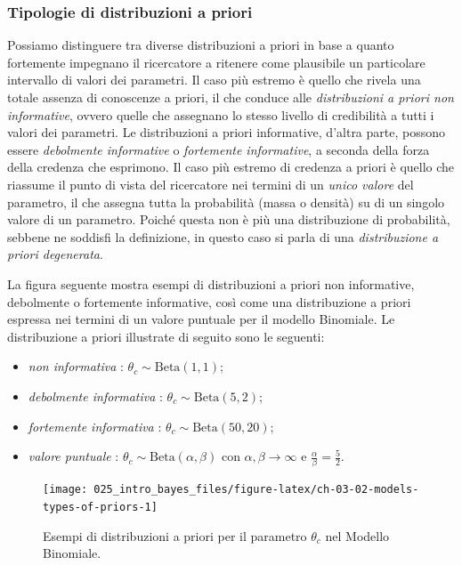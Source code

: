 \documentclass[
  10pt,
  italian,
  a4paper,
  extrafontsizes,onecolumn,openright
  ]{memoir}
\providecommand{\tightlist}{%
  \setlength{\itemsep}{0pt}\setlength{\parskip}{0pt}}
\begin{document}
\hypertarget{tipologie-di-distribuzioni-a-priori}{%
\subsubsection{Tipologie di distribuzioni a priori}\label{tipologie-di-distribuzioni-a-priori}}

Possiamo distinguere tra diverse distribuzioni a priori in base a quanto fortemente impegnano il ricercatore a ritenere come plausibile un particolare intervallo di valori dei parametri. Il caso più estremo è quello che rivela una totale assenza di conoscenze a priori, il che conduce alle \emph{distribuzioni a priori non informative}, ovvero quelle che assegnano lo stesso livello di credibilità a tutti i valori dei parametri. Le distribuzioni a priori informative, d'altra parte, possono essere \emph{debolmente informative} o \emph{fortemente informative}, a seconda della forza della credenza che esprimono. Il caso più estremo di credenza a priori è quello che riassume il punto di vista del ricercatore nei termini di un \emph{unico valore} del parametro, il che assegna tutta la probabilità (massa o densità) su di un singolo valore di un parametro. Poiché questa non è più una distribuzione di probabilità, sebbene ne soddisfi la definizione, in questo caso si parla di una \emph{distribuzione a priori degenerata}.

La figura seguente mostra esempi di distribuzioni a priori non informative, debolmente o fortemente informative, così come una distribuzione a priori espressa nei termini di un valore puntuale per il modello Binomiale. Le distribuzione a priori illustrate di seguito sono le seguenti:

\begin{itemize}
\tightlist
\item
  \emph{non informativa} : \(\theta_c \sim \text{Beta}(1,1)\);
\item
  \emph{debolmente informativa} : \(\theta_c \sim \text{Beta}(5,2)\);
\item
  \emph{fortemente informativa} : \(\theta_c \sim \text{Beta}(50,20)\);
\item
  \emph{valore puntuale} : \(\theta_c \sim \text{Beta}(\alpha, \beta)\) con \(\alpha, \beta \rightarrow \infty\) e \(\frac{\alpha}{\beta} = \frac{5}{2}\).
\end{itemize}

\begin{figure}[h]

{\centering \texttt{[image: 025\_intro\_bayes\_files/figure-latex/ch-03-02-models-types-of-priors-1]} 

}

\caption{Esempi di distribuzioni a priori per il parametro $\theta_c$ nel Modello Binomiale.}\label{fig:ch-03-02-models-types-of-priors}
\end{figure}
\end{document}
